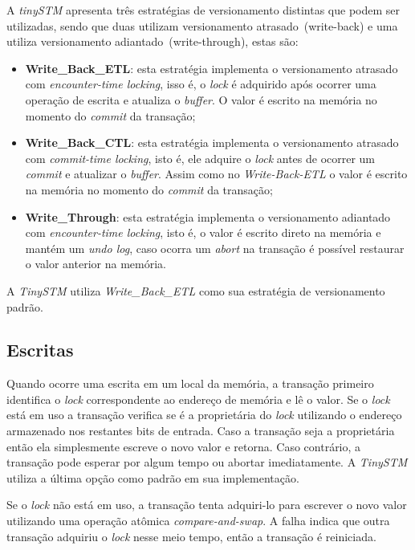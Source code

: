 \documentclass[diss,capa]{texufpel}
\begin{document}
A \emph{tinySTM} apresenta três estratégias de versionamento distintas que podem ser utilizadas, sendo que duas utilizam versionamento atrasado~(write-back) e uma utiliza versionamento adiantado~(write-through), estas são:

\begin{itemize}
\item \textbf{Write\_Back\_ETL}: esta estratégia implementa o versionamento atrasado com \emph{encounter-time locking}, isso é, o \emph{lock} é adquirido após ocorrer uma operação de escrita e atualiza o \emph{buffer}. O valor é escrito na memória no momento do \emph{commit} da transação;

\item \textbf{Write\_Back\_CTL}: esta estratégia implementa o versionamento atrasado com \emph{commit-time locking}, isto é, ele adquire o \emph{lock} antes de ocorrer um \emph{commit} e atualizar o \emph{buffer}. Assim como no \emph{Write-Back-ETL} o valor é escrito na memória no momento do \emph{commit} da transação;

\item \textbf{Write\_Through}: esta estratégia implementa o versionamento adiantado com \emph{encounter-time locking}, isto é, o valor é escrito direto na memória e mantém um \emph{undo log}, caso ocorra um \emph{abort} na transação é possível restaurar o valor anterior na memória.
\end{itemize}

A \emph{TinySTM} utiliza \emph{Write\_Back\_ETL} como sua estratégia de versionamento padrão.

\subsection{Escritas}

Quando ocorre uma escrita em um local da memória, a transação primeiro identifica o \emph{lock} correspondente ao endereço de memória e lê o valor. Se o \emph{lock} está em uso a transação verifica se é a proprietária do \emph{lock} utilizando o endereço armazenado nos restantes bits de entrada. Caso a transação seja a proprietária então ela simplesmente escreve o novo valor e retorna. Caso contrário, a transação pode esperar por algum tempo ou abortar imediatamente. A \emph{TinySTM} utiliza a última opção como padrão em sua implementação.

Se o \emph{lock} não está em uso, a transação tenta adquiri-lo para escrever o novo valor utilizando uma operação atômica \emph{compare-and-swap}. A falha indica que outra transação adquiriu o \emph{lock} nesse meio tempo, então a transação é reiniciada.
\end{document}
